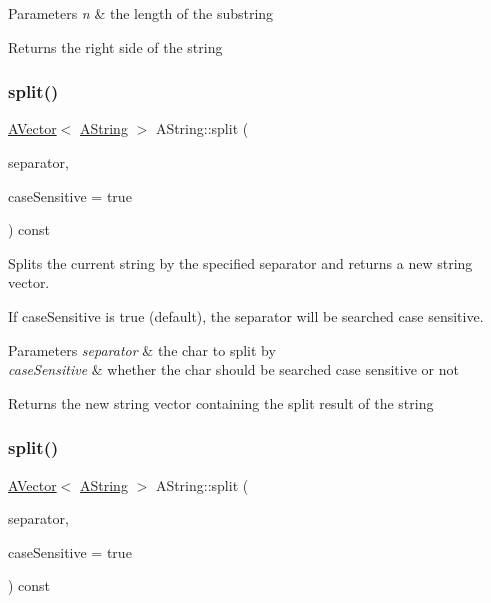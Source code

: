 \begin{DoxyParams}{Parameters}
{\em n} & the length of the substring \\
\hline
\end{DoxyParams}
\begin{DoxyReturn}{Returns}
the right side of the string 
\end{DoxyReturn}
\mbox{\label{class_a_string_a6379fc6d17388a71589b983ba651bf8c}} 
\subsubsection{\texorpdfstring{split()}{split()}\hspace{0.1cm}{\footnotesize\ttfamily [1/2]}}
{\footnotesize\ttfamily \mbox{\hyperlink{class_a_vector}{A\+Vector}}$<$ \mbox{\hyperlink{class_a_string}{A\+String}} $>$ A\+String\+::split (\begin{DoxyParamCaption}\item[{char}]{separator,  }\item[{bool}]{case\+Sensitive = {\ttfamily true} }\end{DoxyParamCaption}) const}



Splits the current string by the specified separator and returns a new string vector. 

If case\+Sensitive is true (default), the separator will be searched case sensitive.


\begin{DoxyParams}{Parameters}
{\em separator} & the char to split by \\
\hline
{\em case\+Sensitive} & whether the char should be searched case sensitive or not \\
\hline
\end{DoxyParams}
\begin{DoxyReturn}{Returns}
the new string vector containing the split result of the string 
\end{DoxyReturn}
\mbox{\label{class_a_string_aee23c2323dc95f9e9c19512c9c985974}} 
\subsubsection{\texorpdfstring{split()}{split()}\hspace{0.1cm}{\footnotesize\ttfamily [2/2]}}
{\footnotesize\ttfamily \mbox{\hyperlink{class_a_vector}{A\+Vector}}$<$ \mbox{\hyperlink{class_a_string}{A\+String}} $>$ A\+String\+::split (\begin{DoxyParamCaption}\item[{const \mbox{\hyperlink{class_a_string}{A\+String}} \&}]{separator,  }\item[{bool}]{case\+Sensitive = {\ttfamily true} }\end{DoxyParamCaption}) const}



